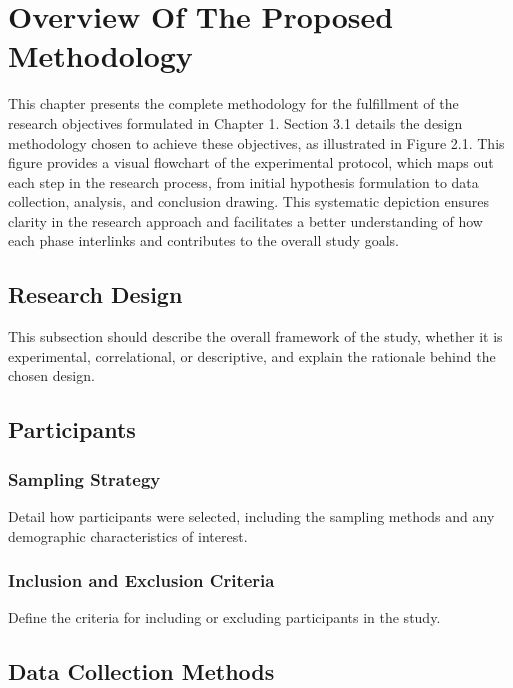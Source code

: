 \section{Overview Of The Proposed Methodology}



This chapter presents the complete methodology for the fulfillment of the research objectives formulated in Chapter 1. Section 3.1 details the design methodology chosen to achieve these objectives, as illustrated in Figure 2.1. This figure provides a visual flowchart of the experimental protocol, which maps out each step in the research process, from initial hypothesis formulation to data collection, analysis, and conclusion drawing. This systematic depiction ensures clarity in the research approach and facilitates a better understanding of how each phase interlinks and contributes to the overall study goals.



\subsection{Research Design}
This subsection should describe the overall framework of the study, whether it is experimental, correlational, or descriptive, and explain the rationale behind the chosen design.

\subsection{Participants}
\subsubsection{Sampling Strategy}
Detail how participants were selected, including the sampling methods and any demographic characteristics of interest.
\subsubsection{Inclusion and Exclusion Criteria}
Define the criteria for including or excluding participants in the study.

\subsection{Data Collection Methods}
